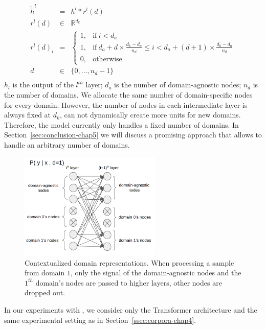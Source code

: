 \begin{equation}
\begin{array}{rcl}
\tilde{h}^{l} &=& h^{l} * r^{l}(d) \\
r^{l}(d) & \in & \mathbb{R}^{d_k} \\
r^{l}(d)_i &=& \begin{cases}
      1, & \text{if}\ i<d_a \\
      1, & \text{if}\ d_a + d \times \frac{d_k - d_a}{n_d} \leq i < d_a + (d+1) \times \frac{d_k - d_a}{n_d} \\
      0, & \text{otherwise}
    \end{cases} \\
d & \in & \{0,\dots,n_d-1 \} \\
\end{array}
\label{eq:sparse-chap5}
\end{equation}
$h_l$ is the output of the $l^{th}$ layer; $d_a$ is the number of domain-agnostic nodes; $n_d$ is the number of domains. We allocate the same number of domain-specific nodes for every domain. However, the number of nodes in each intermediate layer is always fixed at $d_k$,  can not dynamically create more units for new domains. Therefore, the model currently only handles a fixed number of domains. In Section~\ref{sec:conclusion-chap5} we will discuss a promising approach that allows  to handle an arbitrary number of domains.

\begin{figure}[h!]
  \center
  \includegraphics[width=0.6\textwidth]{graphics/Sparse_layers}
  \caption{Contextualized domain representations. When processing a sample from domain $1$, only the signal of the domain-agnostic nodes and the $1^{th}$ domain's nodes are passed to higher layers, other nodes are dropped out.} 
  \label{fig:sparse-chap5}
\end{figure}
In our experiments with , we consider only the Transformer architecture and the same experimental setting as in Section~\ref{ssec:corpora-chap4}.

